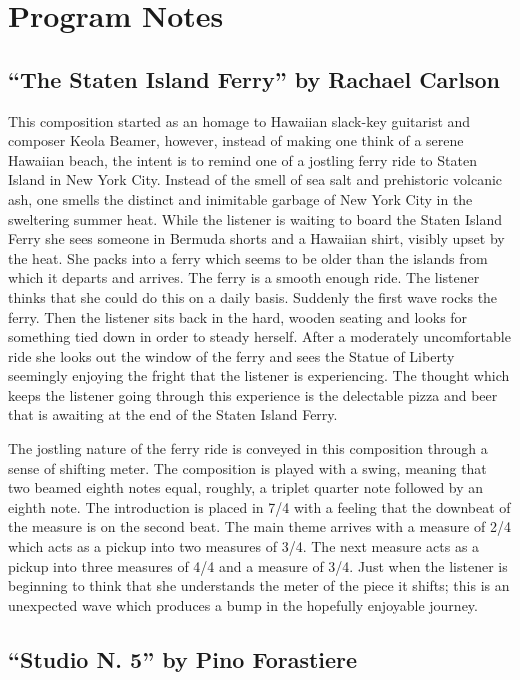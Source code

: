 \documentclass{tufte-handout}
\begin{document}
\clearpage

\section*{Program Notes}
\label{sec:program-notes}
\subsection*{``The Staten Island Ferry'' by Rachael Carlson}
This composition started as an homage to Hawaiian slack-key guitarist
and composer Keola Beamer, however, instead of making one think of a
serene Hawaiian beach, the intent is to remind one of a jostling ferry
ride to Staten Island in New York City. Instead of the smell of sea
salt and prehistoric volcanic ash, one smells the distinct and
inimitable garbage of New York City in the sweltering summer
heat. While the listener is waiting to board the Staten Island Ferry
she sees someone in Bermuda shorts and a Hawaiian shirt, visibly upset
by the heat. She packs into a ferry which seems to be older than the
islands from which it departs and arrives. The ferry is a smooth
enough ride. The listener thinks that she could do this on a daily
basis. Suddenly the first wave rocks the ferry. Then the listener sits
back in the hard, wooden seating and looks for something tied down in
order to steady herself. After a moderately uncomfortable ride she
looks out the window of the ferry and sees the Statue of Liberty
seemingly enjoying the fright that the listener is experiencing. The
thought which keeps the listener going through this experience is the
delectable pizza and beer that is awaiting at the end of the Staten
Island Ferry.

The jostling nature of the ferry ride is conveyed in this composition
through a sense of shifting meter. The composition is played with a
swing, meaning that two beamed eighth notes equal, roughly, a triplet
quarter note followed by an eighth note. The introduction is placed in
7/4 with a feeling that the downbeat of the measure is on the second
beat. The main theme arrives with a measure of 2/4 which acts as a
pickup into two measures of 3/4. The next measure acts as a pickup
into three measures of 4/4 and a measure of 3/4. Just when the
listener is beginning to think that she understands the meter of the
piece it shifts; this is an unexpected wave which produces a bump in
the hopefully enjoyable journey.
\subsection*{``Studio N. 5'' by Pino Forastiere}
\end{document}
